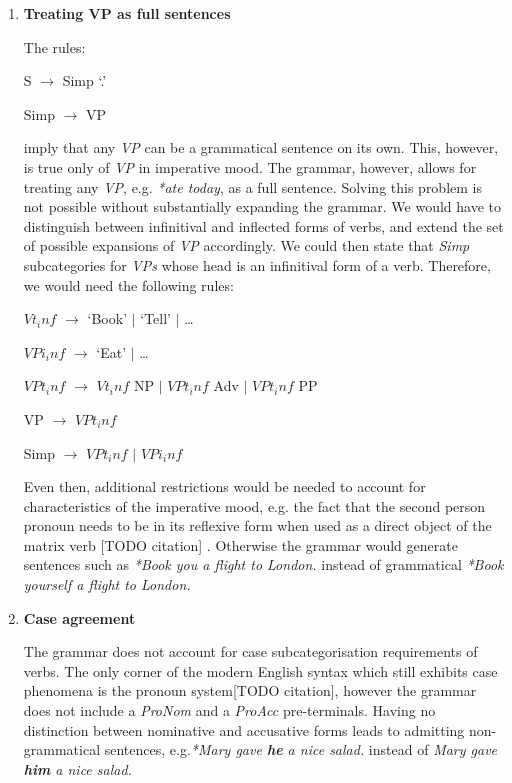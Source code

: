 \documentclass{article}
\begin{document}
\begin{description}
\begin{enumerate}
		\item
		\textbf{Treating VP as full sentences}
		
		The rules:
		\begin{center}
			
			S $\rightarrow$ Simp ‘.’
			
			Simp $\rightarrow$ VP
			
		\end{center}
		imply that any \emph{VP} can be a grammatical sentence on its own. This, however, is true only of \emph{VP} in imperative mood. The grammar, however, allows for treating any \emph{VP}, e.g. \emph{*ate today}, as a full sentence. Solving this problem is not possible without substantially expanding the grammar. We would have to distinguish between infinitival and inflected forms of verbs, and extend the set of possible expansions of \emph{VP} accordingly. We could then state that \emph{Simp} subcategories for \emph{VPs} whose head is an infinitival form of a verb. Therefore, we would need the following rules:
		\begin{center}
			
			$Vt_inf$ $\rightarrow$ ‘Book’ $\vert$ ‘Tell’ $\vert$ …
			
			$VPi_inf$ $\rightarrow$ ‘Eat' $\vert$ …
			
			$VPt_inf$ $\rightarrow$ $Vt_inf$ NP $\vert$ $VPt_inf$ Adv $\vert$ $VPt_inf$ PP
			
			VP $\rightarrow$ $VPt_inf$
			
			Simp $\rightarrow$ $VPt_inf$ $\vert$ $VPi_inf$
			
		\end{center}
		Even then, additional restrictions would be needed to account for characteristics of the imperative mood, e.g. the fact that the second person pronoun needs to be in its reflexive form when used as a direct object of the matrix verb [TODO citation] . Otherwise the grammar would generate sentences such as \emph{*Book you a flight to London.} instead of grammatical \emph{*Book yourself a flight to London.}
		
		\item
		\textbf{Case agreement}
		
		The grammar does not account for case subcategorisation requirements of verbs. The only corner of the modern English syntax which still exhibits case phenomena is the pronoun system[TODO citation], however the grammar does not include a \emph{ProNom} and a \emph{ProAcc} pre-terminals. Having no distinction between nominative and accusative forms leads to admitting non-grammatical sentences, e.g.\emph{*Mary gave \textbf{he} a nice salad.} instead of \emph{Mary gave \textbf{him} a nice salad.}
		

\end{enumerate}
\end{description}
\end{document}
